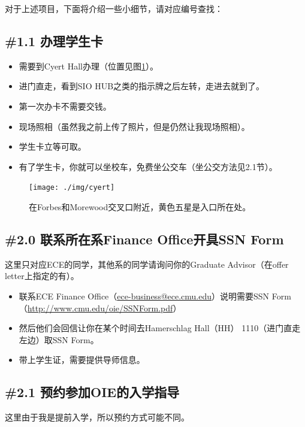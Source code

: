 \documentclass[letterpaper,10pt]{article}
\begin{document}
	对于上述项目，下面将介绍一些小细节，请对应编号查找：
	
	\newpage
	
	\subsection*{\#1.1 办理学生卡}
	
	\begin{itemize}
		\item 需要到Cyert Hall办理（位置见图\ref{fig:cyert}）。
		\item 进门直走，看到SIO HUB之类的指示牌之后左转，走进去就到了。
		\item 第一次办卡不需要交钱。
		\item 现场照相（虽然我之前上传了照片，但是仍然让我现场照相）。
		\item 学生卡立等可取。
		\item 有了学生卡，你就可以坐校车，免费坐公交车（坐公交方法见2.1节）。
	\end{itemize}
	
	\begin{figure}[!h]
		\centering
		\texttt{[image: ./img/cyert]}
		\caption{在Forbes和Morewood交叉口附近，黄色五星是入口所在处。}
		\label{fig:cyert}
	\end{figure}
	
	\subsection*{\#2.0 联系所在系Finance Office开具SSN Form}
	
	这里只对应ECE的同学，其他系的同学请询问你的Graduate Advisor（在offer letter上指定的有）。
	
	\begin{itemize}
		\item 联系ECE Finance Office（\url{ece-business@ece.cmu.edu}）说明需要SSN Form（\url{http://www.cmu.edu/oie/SSNForm.pdf}）
		\item 然后他们会回信让你在某个时间去Hamerschlag Hall（HH） 1110（进门直走左边）取SSN Form。
		\item 带上学生证，需要提供导师信息。
	\end{itemize}
	
	\subsection*{\#2.1 预约参加OIE的入学指导}
	
	这里由于我是提前入学，所以预约方式可能不同。
	
\end{document}
